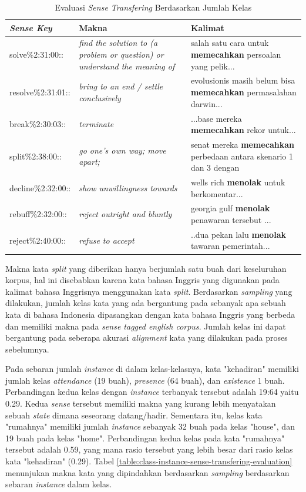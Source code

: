 \begin{table}
	\centering
	\caption{Evaluasi \textit{Sense Transfering} Berdasarkan Jumlah Kelas}
	\label{table:number-classes-sense-transfering-evaluation}
	\begin{tabular}{|p{4cm}|p{4cm}|p{4cm}|}
		\hline
		\textbf{\textit{Sense Key}} & \textbf{Makna} & \textbf{Kalimat}
		\\ \hline
		solve\%2:31:00::  & 
		\textit{find the solution to (a problem or question) or understand the meaning of}   & 
		salah satu cara untuk \textbf{memecahkan} persoalan yang pelik...
		\\ \hline
		resolve\%2:31:01:: & 
		\textit{bring to an end / settle conclusively}   & 
		evolusionis masih belum bisa \textbf{memecahkan} permasalahan darwin...
		\\ \hline
		break\%2:30:03:: & 
		\textit{terminate}   & 
		...base mereka \textbf{memecahkan} rekor untuk...
		\\ \hline
		split\%2:38:00:: &
		\textit{go one's own way; move apart;} &
		senat mereka \textbf{memecahkan} perbedaan antara skenario 1 dan 3 dengan
		\\ \hline
		decline\%2:32:00:: &
		\textit{show unwillingness towards} &
		wells rich \textbf{menolak} untuk berkomentar...
		\\ \hline
		rebuff\%2:32:00:: &
		\textit{reject outright and bluntly} &
		georgia gulf \textbf{menolak} penawaran tersebut ...
		\\ \hline
		reject\%2:40:00:: &
		\textit{refuse to accept} &
		..dua pekan lalu \textbf{menolak} tawaran pemerintah...
		\\ \hline
	\end{tabular}
\end{table}

Makna kata \textit{split} yang diberikan hanya berjumlah satu buah dari keseluruhan korpus, hal ini disebabkan karena kata bahasa Inggris yang digunakan pada kalimat bahasa Inggrisnya menggunakan kata \textit{split}. Berdasarkan \textit{sampling} yang dilakukan, jumlah kelas kata yang ada bergantung pada sebanyak apa sebuah kata di bahasa Indonesia dipasangkan dengan kata bahasa Inggris yang berbeda dan memiliki makna pada \textit{sense tagged english corpus}. Jumlah kelas ini dapat bergantung pada seberapa akurasi \textit{alignment} kata yang dilakukan pada proses sebelumnya.

Pada sebaran jumlah \textit{instance} di dalam kelas-kelasnya, kata "kehadiran" memiliki jumlah kelas \textit{attendance} (19 buah), \textit{presence} (64 buah), dan \textit{existence
} 1 buah. Perbandingan kedua kelas dengan \textit{instance} terbanyak tersebut adalah 19:64 yaitu 0.29. Kedua \textit{sense} tersebut memiliki makna yang kurang lebih menyatakan sebuah \textit{state} dimana seseorang datang/hadir. Sementara itu, kelas kata "rumahnya" memiliki jumlah \textit{instance} sebanyak 32 buah pada kelas "house", dan 19 buah pada kelas "home". Perbandingan kedua kelas pada kata "rumahnya" tersebut adalah 0.59, yang mana rasio tersebut yang lebih besar dari rasio kelas kata "kehadiran" (0.29). Tabel \ref{table:class-instance-sense-transfering-evaluation} menunjukan makna kata yang dipindahkan berdasarkan \textit{sampling} berdasarkan sebaran \textit{instance} dalam kelas.

